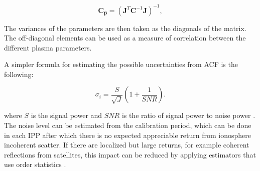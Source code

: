 \begin{equation}
\label{eqn:jacinv}
\mathbf{C}_{\mathbf{\hat{p}}}=(\mathbf{J}^T \mathbf{C}^{-1}\mathbf{J})^{-1},
\end{equation}

\noindent  The variances of the parameters are then taken as the diagonals of the matrix. The off-diagonal elements can be used as a measure of correlation between the different plasma parameters.

%
%



A simpler formula for estimating the possible uncertainties from ACF is the following:

\begin{equation}
\label{sigpow}
\sigma_i = \frac{S}{\sqrt{J}}\left(1+\frac{1}{SNR}\right).
\end{equation}

\noindent where $S$ is the signal power and $SNR$ is the ratio of signal power to noise power \cite{nicollsisrschool2013}. The noise level can be estimated from the calibration period, which can be done in each IPP after which there is no expected appreciable return from ionosphere incoherent scatter. If there are localized but large returns, for example coherent reflections from satellites, this impact can be reduced by applying estimators that use order statistics \cite{ordstatcfar}.


